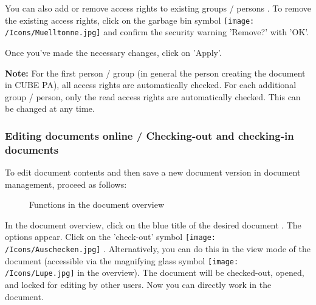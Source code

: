 \vspace{\baselineskip}

You can also add or remove access rights to existing groups / persons . To remove the existing access rights, click on the garbage bin symbol \texttt{[image: /Icons/Muelltonne.jpg]}  and confirm the security warning 'Remove?' with 'OK'.  \newline

Once you've made the necessary changes, click on 'Apply'. 

\vspace{\baselineskip}

\textbf{Note:} For the first person / group (in general the person creating the document in CUBE PA), all access rights are automatically checked. For each additional group / person, only the read access rights are automatically checked. This can be changed at any time.


\subsubsection{Editing documents online / Checking-out and checking-in documents}
\label{bkm:Ref442780171}\label{bkm:Ref442776572}

To edit document contents and then save a new document version in document management, proceed as follows:

\begin{figure}[H]
\caption{Functions in the document overview}
\end{figure}

In the document overview, click on the blue title of the desired document . The options appear. Click on the 'check-out' symbol \texttt{[image: /Icons/Auschecken.jpg]} . Alternatively, you can do this in the view mode of the document (accessible via the magnifying glass symbol \texttt{[image: /Icons/Lupe.jpg]}  in the overview). The document will be checked-out, opened, and locked for editing by other users. Now you can directly work in the document.

